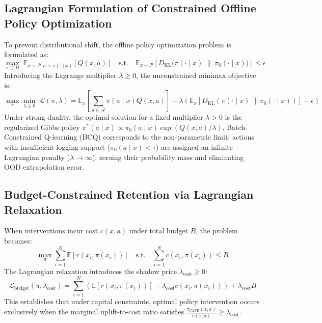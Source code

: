\documentclass[preprint,12pt,3p]{elsarticle}
\begin{document}
\subsection{Lagrangian Formulation of Constrained Offline Policy Optimization}
To prevent distributional shift, the offline policy optimization problem is formulated as:
\begin{equation}
\max_{\pi \in \Pi} \; \mathbb{E}_{x \sim \mathcal{P}, a \sim \pi(\cdot \mid x)} \left[ Q(x, a) \right] \quad \text{s.t.} \quad \mathbb{E}_{x \sim \mathcal{P}} \left[ D_{\mathrm{KL}}\Big( \pi(\cdot \mid x) \;\big\|\; \pi_0(\cdot \mid x) \Big) \right] \le \epsilon
\end{equation}
Introducing the Lagrange multiplier $\lambda \ge 0$, the unconstrained minimax objective is:
\begin{equation}
\max_{\pi} \min_{\lambda \ge 0} \; \mathcal{L}(\pi, \lambda) = \mathbb{E}_{x} \left[ \sum_{a \in \mathcal{A}} \pi(a \mid x) Q(x, a) \right] - \lambda \left( \mathbb{E}_{x} \left[ D_{\mathrm{KL}}(\pi(\cdot \mid x) \,\|\, \pi_0(\cdot \mid x)) \right] - \epsilon \right)
\end{equation}
Under strong duality, the optimal solution for a fixed multiplier $\lambda > 0$ is the regularized Gibbs policy $\pi^*(a \mid x) \propto \pi_0(a \mid x) \exp(Q(x, a)/\lambda)$. Batch-Constrained Q-learning (BCQ) corresponds to the non-parametric limit: actions with insufficient logging support ($\pi_0(a \mid x) < \tau$) are assigned an infinite Lagrangian penalty ($\lambda \to \infty$), zeroing their probability mass and eliminating OOD extrapolation error.

\subsection{Budget-Constrained Retention via Lagrangian Relaxation}
When interventions incur cost $c(x, a)$ under total budget $B$, the problem becomes:
\begin{equation}
\max_{\pi} \sum_{i=1}^N \mathbb{E}\left[ r(x_i, \pi(x_i)) \right] \quad \text{s.t.} \quad \sum_{i=1}^N c(x_i, \pi(x_i)) \le B
\end{equation}
The Lagrangian relaxation introduces the shadow price $\lambda_{\mathrm{cost}} \ge 0$:
\begin{equation}
\mathcal{L}_{\mathrm{budget}}(\pi, \lambda_{\mathrm{cost}}) = \sum_{i=1}^N \left( \mathbb{E}\left[ r(x_i, \pi(x_i)) \right] - \lambda_{\mathrm{cost}} c(x_i, \pi(x_i)) \right) + \lambda_{\mathrm{cost}} B
\end{equation}
This establishes that under capital constraints, optimal policy intervention occurs exclusively when the marginal uplift-to-cost ratio satisfies $\frac{\tau_{\mathrm{CATE}}(x, a)}{c(x, a)} \ge \lambda_{\mathrm{cost}}$.
\end{document}
